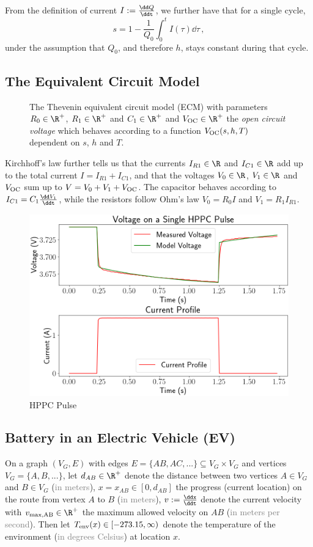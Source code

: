 \documentclass{prettytex/ox/mmsc-special-topic}
\begin{document}
  From the definition of current $I := \frac{\dd Q}{\ddt}$, we further have that for a single cycle,
  $$s = 1 - \frac{1}{Q_0} \int_0^t I(\tau) \dd\tau \,,$$
  under the assumption that $Q_0$, and therefore $h$, stays constant during that cycle.

  \subsection{The Equivalent Circuit Model}
  \begin{figure}[H]
    \centering
    \caption{
      The Thevenin equivalent circuit model (ECM) with parameters $R_0 \in \R^+$, $R_1 \in \R^+$ and $C_1 \in \R^+$ and $V_{\rm OC} \in \R^+$ the \textit{open circuit voltage} which behaves according to a function $V_{\rm OC}(s, h, T)$ dependent on $s$, $h$ and $T$.
    }
  \end{figure}

  Kirchhoff's law further tells us that the currents $I_{R1} \in \R$ and $I_{C1} \in \R$ add up to the total current $I = I_{R1} + I_{C1}$, and that the voltages $V_0 \in \R$, $V_1 \in \R$ and $V_{\rm OC}$ sum up to $V = V_0 + V_1 + V_{\rm OC}$.
  The capacitor behaves according to $I_{C1} = C_1 \frac{\dd V_1}{\ddt}$, while the resistors follow Ohm's law $V_0 = R_0 I$ and $V_1 = R_1 I_{R1}$.

  \begin{figure}[H]
    \centering
    \includegraphics[width=0.6\linewidth]{figures/hppc-pulse.png}
    \caption{HPPC Pulse}
    \label{fig:hppc-pulse}
  \end{figure}

  \subsection{Battery in an Electric Vehicle (EV)}
  On a graph $(V_G, E)$ with edges $E = \{AB, AC, ...\} \subseteq V_G \times V_G$ and vertices $V_G = \{A, B, ...\}$, let
  $d_{AB} \in \R^+$ denote the distance between two vertices $A \in V_G$ and $B \in V_G$ (\textcolor{gray}{in meters}),
  $x = x_{AB} \in [0, d_{AB}]$ the progress (current location) on the route from vertex $A$ to $B$ (\textcolor{gray}{in meters}),
  $v := \frac{\ddx}{\ddt}$ denote the current velocity with
  $v_{\rm max, AB} \in \R^+$ the maximum allowed velocity on $AB$ (\textcolor{gray}{in meters per second}).
  Then let
  $T_{\rm env}(x) \in [-273.15, \infty)$ denote the temperature of the environment (\textcolor{gray}{in degrees Celsius}) at location $x$.
\end{document}
